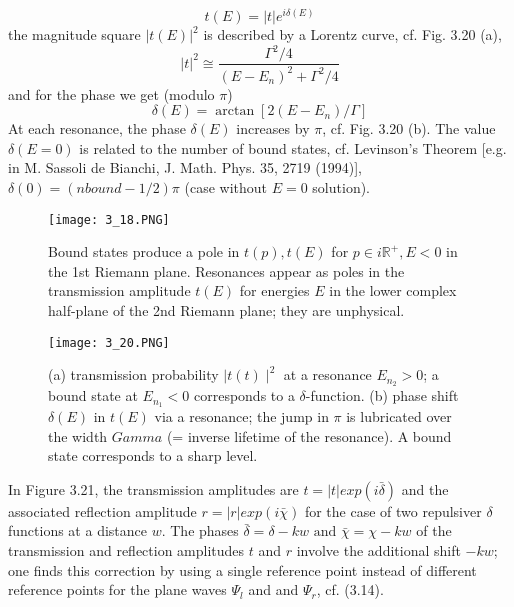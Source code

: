 \begin{equation}
    t(E)=|t| e^{i \delta(E)}
    \end{equation}
the magnitude square $| t (E) |^2$ is described by a Lorentz curve, cf. Fig. 3.20 (a),
\begin{equation}
    |t|^{2} \cong \frac{\Gamma^{2} / 4}{\left(E-E_{n}\right)^{2}+\Gamma^{2} / 4}
    \end{equation}
and for the phase we get (modulo $\pi$)
\begin{equation}
    \delta(E)=\arctan \left[2\left(E-E_{n}\right) / \Gamma\right]
    \end{equation}
At each resonance, the phase $\delta (E)$ increases by $\pi$, cf. Fig. 3.20 (b). The value $\delta (E = 0)$ is related to the number of bound states, cf. Levinson's Theorem [e.g. in M. Sassoli de Bianchi, J. Math. Phys. 35, 2719 (1994)], $\delta (0) = (nbound - 1/2) \pi$ (case without $E = 0$ solution).
\begin{figure}[ht]
    \centering
    \texttt{[image: 3\_18.PNG]}
    \caption{Bound states produce a pole in $t (p), t (E)$ for $p \in i\mathbb{R}^+, E <0$ in the 1st Riemann plane. Resonances appear as poles in the transmission amplitude $t (E)$ for energies $E$ in the lower complex half-plane of the 2nd Riemann plane; they are unphysical.}
\end{figure}
\begin{figure}[ht]
    \begin{minipage}{0.5\textwidth}
        \centering
        \texttt{[image: 3\_20.PNG]}
    \end{minipage}
    \begin{minipage}{0.5\textwidth}
        \caption{(a) transmission probability $\mid t(t)\mid^2$ at a resonance $E_{n_2}> 0$; a bound state at $E_{n_1} <0$ corresponds to a $\delta$-function. (b) phase shift $\delta(E)$ in $t (E)$ via a resonance; the jump in $\pi$ is lubricated over the width $Gamma$ (= inverse lifetime of the resonance). A bound state corresponds to a sharp level.}
    \end{minipage}
\end{figure}
In Figure 3.21, the transmission amplitudes are $t = | t | exp (i\bar{\delta})$ and the associated reflection amplitude $r = | r | exp (i\bar{\chi})$ for the case of two repulsiver $\delta$ functions at a distance $w$. The phases $\bar{\delta} = \delta - kw \text{ and } \bar{\chi}=\chi-kw$ of the transmission and reflection amplitudes $t$ and $r$ involve the additional shift $-kw$; one finds this correction by using a single reference point instead of different reference points for the plane waves $\Psi_l$ and and $\Psi_r$, cf. (3.14).
